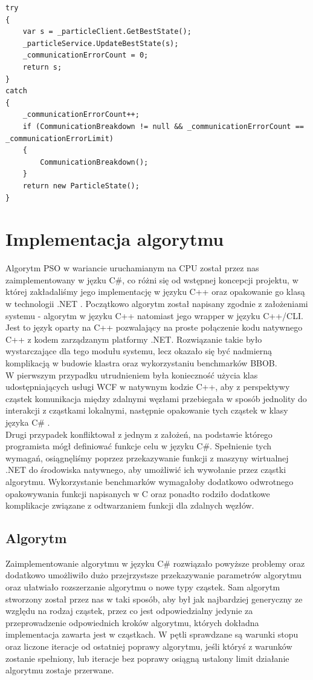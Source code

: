 \documentclass[12pt, twoside, openany, abstract=on]{report}
\theoremstyle{definition}
\begin{document}
\lstset{style=sharpc}
\begin{lstlisting}[frame=single]
try
{
	var s = _particleClient.GetBestState();
	_particleService.UpdateBestState(s);
	_communicationErrorCount = 0;
	return s;
}
catch
{
	_communicationErrorCount++;
	if (CommunicationBreakdown != null && _communicationErrorCount == 						_communicationErrorLimit)
	{
		CommunicationBreakdown();		
	}
	return new ParticleState();
}
\end{lstlisting}

\section{Implementacja algorytmu}
Algorytm PSO w wariancie uruchamianym na CPU został przez nas zaimplementowany w jęzku C\#, co różni się od wstępnej koncepcji projektu, w której zakładaliśmy jego implementację w języku C++ oraz opakowanie go klasą w technologii .NET . Początkowo algorytm został napisany zgodnie z założeniami systemu - algorytm w języku C++ natomiast jego wrapper w języku C++/CLI. Jest to język oparty na C++ pozwalający na proste połączenie kodu natywnego C++ z kodem zarządzanym platformy .NET. Rozwiązanie takie było wystarczające dla tego modułu systemu, lecz okazało się być nadmierną komplikacją w budowie klastra oraz wykorzystaniu benchmarków BBOB.\\
W pierwszym przypadku utrudnieniem była konieczność użycia klas udostępniających usługi WCF w natywnym kodzie C++, aby  z perspektywy cząstek komunikacja między zdalnymi węzłami przebiegała w sposób jednolity do interakcji z cząstkami lokalnymi, następnie opakowanie tych cząstek w klasy języka C\# .\\
Drugi przypadek konfliktował z jednym z założeń, na podstawie którego programista mógł definiować funkcje celu w języku C\#. Spełnienie tych wymagań, osiągnęliśmy poprzez przekazywanie funkcji z maszyny wirtualnej .NET do środowiska natywnego, aby umożliwić ich wywołanie przez cząstki algorytmu. Wykorzystanie benchmarków wymagałoby dodatkowo odwrotnego opakowywania funkcji napisanych w C oraz ponadto rodziło dodatkowe komplikacje związane z odtwarzaniem funkcji dla zdalnych węzłów.

\subsection{Algorytm}
Zaimplementowanie algorytmu w języku C\# rozwiązało powyższe problemy oraz dodatkowo umożliwiło dużo przejrzystsze przekazywanie parametrów algorytmu oraz ułatwiało rozszerzanie algorytmu o nowe typy cząstek.
Sam algorytm stworzony został przez nas w taki sposób, aby był jak najbardziej generyczny ze względu na rodzaj cząstek, przez co jest odpowiedzialny jedynie za przeprowadzenie odpowiednich kroków algorytmu, których dokładna implementacja zawarta jest w cząstkach. W pętli sprawdzane są warunki stopu oraz liczone iteracje od ostatniej poprawy algorytmu, jeśli któryś z warunków zostanie spełniony, lub iteracje bez poprawy osiągną ustalony limit działanie algorytmu zostaje przerwane.
\end{document}
